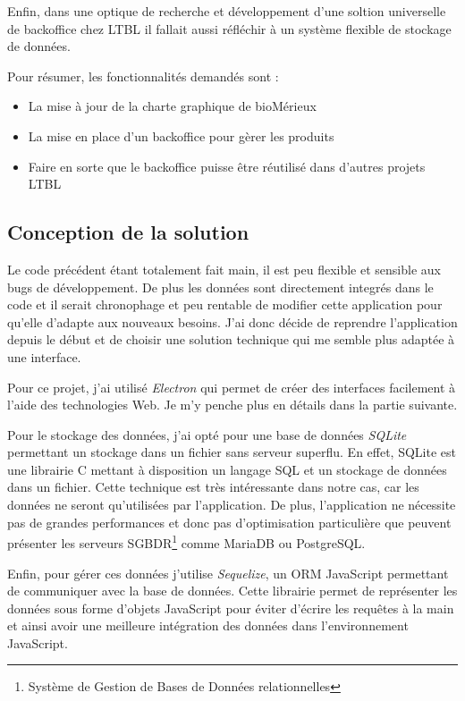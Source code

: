 Enfin, dans une optique de recherche et développement d'une soltion universelle de backoffice chez LTBL il fallait aussi réfléchir à un système flexible de stockage de données.

Pour résumer, les fonctionnalités demandés sont :

\begin{itemize}
    \item La mise à jour de la charte graphique de bioMérieux
    \item La mise en place d'un backoffice pour gèrer les produits
    \item Faire en sorte que le backoffice puisse être réutilisé dans d'autres projets LTBL
\end{itemize}


\subsection{Conception de la solution}

Le code précédent étant totalement fait main, il est peu flexible et sensible aux bugs de développement.
De plus les données sont directement integrés dans le code et il serait chronophage et peu rentable de modifier cette application pour qu'elle d'adapte aux nouveaux besoins.
J'ai donc décide de reprendre l'application depuis le début et de choisir une solution technique qui me semble plus adaptée à une interface.

Pour ce projet, j'ai utilisé \emph{Electron} qui permet de créer des interfaces facilement à l'aide des technologies Web.
Je m'y penche plus en détails dans la partie suivante.

Pour le stockage des données, j'ai opté pour une base de données \emph{SQLite} permettant un stockage dans un fichier sans serveur superflu.
En effet, SQLite est une librairie C mettant à disposition un langage SQL et un stockage de données dans un fichier.
Cette technique est très intéressante dans notre cas, car les données ne seront qu'utilisées par l'application.
De plus, l'application ne nécessite pas de grandes performances et donc pas d'optimisation particulière que peuvent présenter les serveurs SGBDR\footnote{Système de Gestion de Bases de Données relationnelles} comme MariaDB ou PostgreSQL\@.

Enfin, pour gérer ces données j'utilise \emph{Sequelize}, un ORM JavaScript permettant de communiquer avec la base de données.
Cette librairie permet de représenter les données sous forme d'objets JavaScript pour éviter d'écrire les requêtes à la main et ainsi avoir une meilleure intégration des données dans l'environnement JavaScript.

